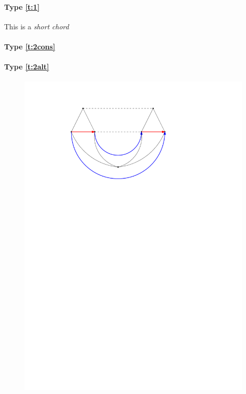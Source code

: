 \paragraph{Type \ref{t:1}}
This is a \emph{short chord}


\paragraph{Type \ref{t:2cons}}

\paragraph{Type \ref{t:2alt}}

\begin{figure}[h]
  \centering
  \includegraphics[scale=1]{4cycles/img/fence_c}
  \caption{}
  \label{fig:}
\end{figure}

